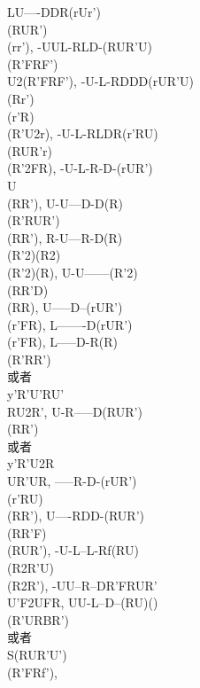 \documentclass{article}
\begin{document}
{    {LU----DDR}{(rUr')\\(RUR')\\(rr')}, %
    {-UUL-RLD-}{(RUR'U)\\(R'FRF')\\U2(R'FRF')}, %
    {-U-L-RDDD}{(rUR'U)\\(Rr')\\(r'R)\\(R'U2r)}, %
    {-U-L-RLDR}{(r'RU)\\(RUR'r)\\(R'2FR)}, %
    {-U-L-R-D-}{(rUR')\\U\\(RR')}, %
    {U-U---D-D}{(R)\\(R'RUR')\\(RR')}, %
    {R-U---R-D}{(R)\\(R'2)(R2)\\(R'2)(R)}, %
    {U-U------}{(R'2)\\(RR'D)\\(RR)}, %
    {U-----D--}{(rUR')\\(r'FR)}, %
    {L-------D}{(rUR')\\(r'FR)}, %
    {L-----D-R}{(R)\\(R'RR')\\或者\\y'R'U'RU'\\RU2R'}, %
    {U-R-----D}{(RUR')\\(RR')\\或者\\y'R'U2R\\UR'UR}, %
    {-----R-D-}{(rUR')\\(r'RU)\\(RR')}, %
    {U----RDD-}{(RUR')\\(RR'F)\\(RUR')}, %
    {-U-L--L-R}{f(RU)\\(R2R'U)\\(R2R')}, %
    {-UU--R--D}{R'FRUR'\\U'F2UFR}, %
    {UU-L--D--}{(RU)()\\(R'URBR')\\或者\\S(RUR'U')\\(R'FRf')}, %
}
\end{document}
